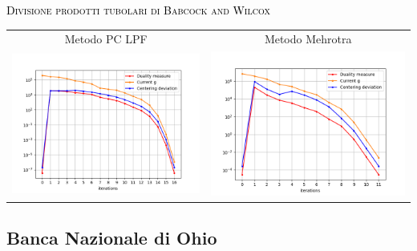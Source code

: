 \begin{frame}{\textsc{\LARGE \textcolor{black}{Divisione prodotti tubolari di Babcock and Wilcox}}}
	\centering
	\begin{tabular}{c@{}c}
		\small{Metodo PC LPF} & \small{Metodo Mehrotra} \\
		\includegraphics[scale = 0.33]{tub_PCLPF2}
		&\includegraphics[scale = 0.33]{tub_MER2}\\ 
	\end{tabular}
\end{frame}


\subsection{Banca Nazionale di Ohio}

